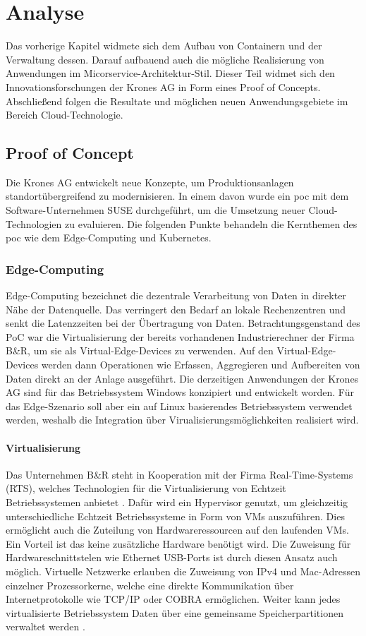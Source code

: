 \chapter{Analyse}

Das vorherige Kapitel widmete sich dem Aufbau von Containern und der Verwaltung dessen.
Darauf aufbauend auch die mögliche Realisierung von Anwendungen im Micorservice-Architektur-Stil. 
Dieser Teil widmet sich den Innovationsforschungen der Krones AG in Form eines Proof of Concepts.
Abschließend folgen die Resultate und möglichen neuen Anwendungsgebiete im Bereich Cloud-Technologie.


\section{Proof of Concept}\label{moderninfra}
Die Krones AG entwickelt neue Konzepte, um Produktionsanlagen standortübergreifend zu modernisieren. 
In einem davon wurde ein \ac{poc} mit dem Software-Unternehmen SUSE durchgeführt, um die Umsetzung neuer Cloud-Technologien zu evaluieren. 
Die folgenden Punkte behandeln die Kernthemen des \acs{poc} wie dem Edge-Computing und Kubernetes.

\subsection{Edge-Computing}
Edge-Computing bezeichnet die dezentrale Verarbeitung von Daten in direkter Nähe der Datenquelle. 
Das verringert den Bedarf an lokale Rechenzentren und senkt die Latenzzeiten bei der Übertragung von Daten. 
Betrachtungsgenstand des PoC war die Virtualisierung der bereits vorhandenen Industrierechner der Firma B\&R, um sie als Virtual-Edge-Devices zu verwenden.
Auf den Virtual-Edge-Devices werden dann Operationen wie Erfassen, Aggregieren und Aufbereiten von Daten direkt an der Anlage ausgeführt. 
Die derzeitigen Anwendungen der Krones AG sind für das Betriebssystem Windows konzipiert und entwickelt worden.
Für das Edge-Szenario soll aber ein auf Linux basierendes Betriebssystem verwendet werden,
weshalb die Integration über Virualisierungsmöglichkeiten realisiert wird.

\subsubsection{Virtualisierung}
Das Unternehmen B\&R steht in Kooperation mit der Firma Real-Time-Systems (RTS), welches Technologien für die Virtualisierung von Echtzeit Betriebssystemen anbietet \cite{rtosandbundr}.
Dafür wird ein Hypervisor genutzt, um gleichzeitig unterschiedliche Echtzeit Betriebssysteme in Form von VMs auszuführen.
Dies ermöglicht auch die Zuteilung von Hardwareressourcen auf den laufenden VMs.
Ein Vorteil ist das keine zusätzliche Hardware benötigt wird.
Die Zuweisung für Hardwareschnittstelen wie Ethernet USB-Ports ist durch diesen Ansatz auch möglich.
Virtuelle Netzwerke erlauben die Zuweisung von IPv4 und Mac-Adressen einzelner Prozessorkerne, welche
eine direkte Kommunikation über Internetprotokolle wie TCP/IP oder COBRA ermöglichen.
Weiter kann jedes virtualisierte Betriebssystem Daten über eine gemeinsame Speicherpartitionen verwaltet werden \cite{rtos}.

